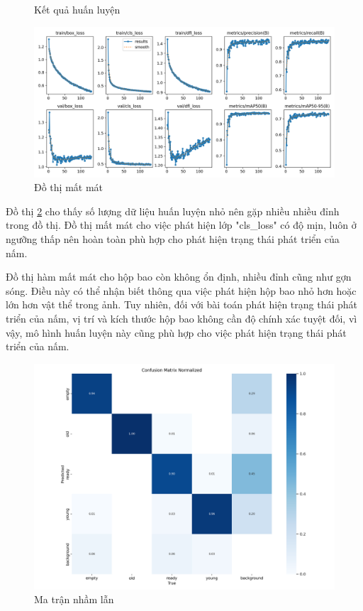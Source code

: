 \begin{figure}[H]
\begin{subfigure}{.5\textwidth}
    \end{subfigure}
    \caption{Kết quả huấn luyện}

    \label{fig:training-result}
\end{figure}

\begin{figure}[h]
    \centering
    \includegraphics[width=0.85\linewidth]{images/results.png}
    \caption{Đồ thị mất mát}
    \label{fig:loss}
\end{figure}

Đồ thị \ref{fig:loss} cho thấy số lượng dữ liệu huấn luyện nhỏ nên gặp nhiều nhiều đỉnh trong đồ thị. Đồ thị mất mát cho việc phát hiện lớp "cls\_loss" có độ mịn, luôn ở ngưỡng thấp nên hoàn toàn phù hợp cho phát hiện trạng thái phát triển của nấm.

Đồ thị hàm mất mát cho hộp bao còn không ổn định, nhiều đỉnh cũng như gợn sóng. Điều này có thể nhận biết thông qua việc phát hiện hộp bao nhỏ hơn hoặc lớn hơn vật thể trong ảnh. Tuy nhiên, đối với bài toán phát hiện trạng thái phát triển của nấm, vị trí và kích thước hộp bao không cần độ chính xác tuyệt đối, vì vậy, mô hình huấn luyện này cũng phù hợp cho việc phát hiện trạng thái phát triển của nấm.

\begin{figure}[H]
	\centering
	\includegraphics[width=0.8\linewidth]{images/confusion_matrix_normalized.png}
	\caption{Ma trận nhầm lẫn}
	\label{fig:confusion-matrix}
\end{figure}

